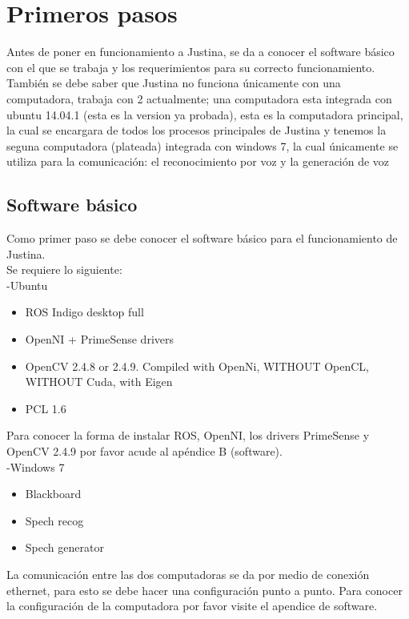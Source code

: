 \documentclass[user_manual.tex]{subfiles}
\begin{document}
 \chapter{Primeros pasos}
 \label{x}
 Antes de poner en funcionamiento a Justina, se da a conocer el software básico con el que se trabaja y los requerimientos para  su correcto funcionamiento. También se debe saber que Justina no funciona únicamente con una computadora, trabaja con 2 actualmente; una computadora esta integrada con ubuntu 14.04.1 (esta es la version ya probada), esta es la computadora principal, la cual se encargara de todos los procesos principales de Justina y tenemos la seguna computadora (plateada) integrada con windows 7, la cual únicamente se utiliza para la comunicación: el reconocimiento por voz y la generación de voz\\
 
 \section{Software básico}
Como primer paso se debe conocer el software básico para el funcionamiento de Justina.\\

Se requiere lo siguiente:\\

-Ubuntu
\begin{itemize}
\item ROS Indigo desktop full
\item OpenNI + PrimeSense drivers
\item OpenCV 2.4.8 or 2.4.9. Compiled with OpenNi, WITHOUT OpenCL, WITHOUT Cuda, with Eigen
\item PCL 1.6
\end{itemize}

Para conocer la forma de instalar ROS, OpenNI, los drivers PrimeSense y OpenCV 2.4.9 por favor acude al apéndice B (software).\\

-Windows 7
\begin{itemize}
\item Blackboard
\item Spech recog
\item Spech generator
\end{itemize}

La comunicación entre las dos computadoras se da por medio de conexión ethernet, para esto se debe hacer una configuración punto a punto. Para conocer la configuración de la computadora por favor visite el apendice de software.
\end{document}
